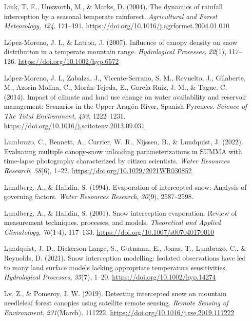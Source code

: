 \documentclass[
  letterpaper,
]{tex/uofsthesis-cs}
\newlength{\cslhangindent}
\newenvironment{CSLReferences}[2] %
 {\begin{list}{}{%
  \setlength{\itemindent}{0pt}
  \setlength{\leftmargin}{0pt}
  \setlength{\parsep}{0pt}
  \ifodd #1
   \setlength{\leftmargin}{\cslhangindent}
   \setlength{\itemindent}{-1\cslhangindent}
  \fi
  \setlength{\itemsep}{#2\baselineskip}}}
 {\end{list}}
\begin{document}
\begin{CSLReferences}{1}{0}
Link, T. E., Unsworth, M., \& Marks, D. (2004). The dynamics of rainfall
interception by a seasonal temperate rainforest. \emph{Agricultural and
Forest Meteorology}, \emph{124}, 171--191.
\url{https://doi.org/10.1016/j.agrformet.2004.01.010}

López-Moreno, J. I., \& Latron, J. (2007). Influence of canopy density
on snow distribution in a temperate mountain range. \emph{Hydrological
Processes}, \emph{22}(1), 117--126.
\url{https://doi.org/10.1002/hyp.6572}

López-Moreno, J. I., Zabalza, J., Vicente-Serrano, S. M., Revuelto, J.,
Gilaberte, M., Azorin-Molina, C., Morán-Tejeda, E., García-Ruiz, J. M.,
\& Tague, C. (2014). Impact of climate and land use change on water
availability and reservoir management: {Scenarios} in the {Upper Aragón
River}, {Spanish Pyrenees}. \emph{Science of The Total Environment},
\emph{493}, 1222--1231.
\url{https://doi.org/10.1016/j.scitotenv.2013.09.031}

Lumbrazo, C., Bennett, A., Currier, W. R., Nijssen, B., \& Lundquist, J.
(2022). Evaluating multiple canopy-snow unloading parameterizations in
{SUMMA} with time-lapse photography characterized by citizen scientists.
\emph{Water Resources Research}, \emph{58}(6), 1--22.
\url{https://doi.org/10.1029/2021WR030852}

Lundberg, A., \& Halldin, S. (1994). Evaporation of intercepted snow:
{Analysis} of governing factors. \emph{Water Resources Research},
\emph{30}(9), 2587--2598.

Lundberg, A., \& Halldin, S. (2001). Snow interception evaporation.
{Review} of measurement techniques, processes, and models.
\emph{Theoretical and Applied Climatology}, \emph{70}(1-4), 117--133.
\url{https://doi.org/10.1007/s007040170010}

Lundquist, J. D., Dickerson-Lange, S., Gutmann, E., Jonas, T., Lumbrazo,
C., \& Reynolds, D. (2021). Snow interception modelling: {Isolated}
observations have led to many land surface models lacking appropriate
temperature sensitivities. \emph{Hydrological Processes}, \emph{35}(7),
1--20. \url{https://doi.org/10.1002/hyp.14274}

Lv, Z., \& Pomeroy, J. W. (2019). Detecting intercepted snow on mountain
needleleaf forest canopies using satellite remote sensing. \emph{Remote
Sensing of Environment}, \emph{231}(March), 111222.
\url{https://doi.org/10.1016/j.rse.2019.111222}


\end{CSLReferences}
\end{document}
